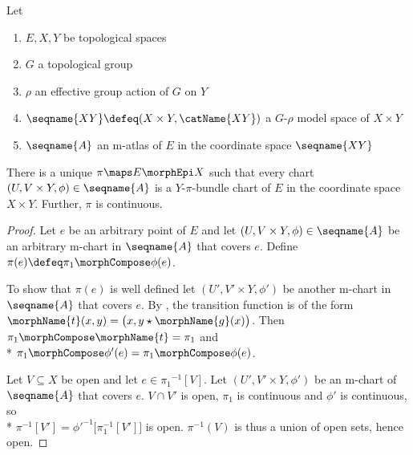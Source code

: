 \documentclass{article}
\begin{document}
\begin{lemma}
\label{lem:Ypichart}
Let
\begin{enumerate}
\item
$E,X,Y$ be topological spaces
\item
$G$ a topological group
\item
$\rho$ an effective group action of $G$ on $Y$
\item
$\seqname{XY} \defeq (X \times Y, \catName{XY})$
a $G$-$\rho$ model space of $X \times Y$
\item
$\seqname{A}$ an m-atlas of $E$ in the coordinate space $\seqname{XY}$
\end{enumerate}

There is a unique $\pi \maps E \morphEpi X$ such that every chart
$(U, V \times Y, \phi) \in \seqname{A}$ is a
$Y$-$\pi$-bundle chart of $E$ in the coordinate space
$X \times Y$. Further, $\pi$ is continuous.

\begin{proof}
Let $e$ be an arbitrary point of $E$ and let
$(U, V \times Y, \phi) \in \seqname{A}$ be an arbitrary m-chart in
$\seqname{A}$ that covers $e$.  Define $\pi(e) \defeq \pi_1 \morphCompose
\phi(e)$.

To show that $\pi(e)$ is well defined let $(U', V' \times Y, \phi')$ be
another m-chart in $\seqname{A}$ that covers $e$.  By
, the transition function is of the form
$\morphName{t}(x, y) = \bigl ( x, y \star \morphName{g}(x) \bigr )$.  Then
$\pi_1 \morphCompose \morphName{t} = \pi_1$ and \\*
$\pi_1 \morphCompose \phi' (e) = \pi_1 \morphCompose \phi (e)$.

Let $V \subseteq X$ be open and let $e \in {\pi_1}^{-1}[V]$. Let
$(U', V' \times Y, \phi')$ be an m-chart of $\seqname{A}$ that covers $e$.
$V \cap V'$ is open, $\pi_1$ is continuous and $\phi'$ is continuous, so \\*
$\pi^{-1}[V'] = \phi'^{-1} \bigl [ \pi_1^{-1}[V'] \bigr ]$ is open.
$\pi^{-1}(V)$ is thus a union of open sets, hence open.
\end{proof}
\end{lemma}
\end{document}
